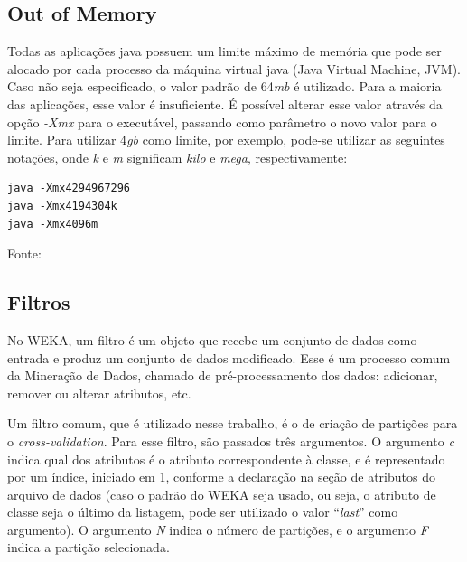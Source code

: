 \subsection{Out of Memory}

Todas as aplicações java possuem um limite máximo de memória que pode ser alocado por cada processo da máquina virtual java (Java Virtual Machine, JVM). Caso não seja especificado, o valor padrão de 64\emph{mb} é utilizado. Para a maioria das aplicações, esse valor é insuficiente. É possível alterar esse valor através da opção \emph{-Xmx} para o executável, passando como parâmetro o novo valor para o limite. Para utilizar 4\emph{gb} como limite, por exemplo, pode-se utilizar as seguintes notações, onde \emph{k} e \emph{m} significam \emph{kilo} e \emph{mega}, respectivamente:

\vspace{0.5cm}
\begin{lstlisting}[caption=Opções para aumentar o limite de meória da JVM, label=lst:dev_java_xmx]
java -Xmx4294967296
java -Xmx4194304k
java -Xmx4096m
\end{lstlisting}
\vspace{0.25cm}
\centerline{Fonte: \cite{Oracle1995}}
\vspace{0.5cm}

\subsection{Filtros}

No WEKA, um filtro é um objeto que recebe um conjunto de dados como entrada e produz um conjunto de dados modificado. Esse é um processo comum da Mineração de Dados, chamado de pré-processamento dos dados: adicionar, remover ou alterar atributos, etc.

Um filtro comum, que é utilizado nesse trabalho, é o de criação de partições para o \emph{cross-validation}. Para esse filtro, são passados três argumentos. O argumento \emph{c} indica qual dos atributos é o atributo correspondente à classe, e é representado por um índice, iniciado em 1, conforme a declaração na seção de atributos do arquivo de dados (caso o padrão do WEKA seja usado, ou seja, o atributo de classe seja o último da listagem, pode ser utilizado o valor ``\emph{last}'' como argumento). O argumento \emph{N} indica o número de partições, e o argumento \emph{F} indica a partição selecionada.

